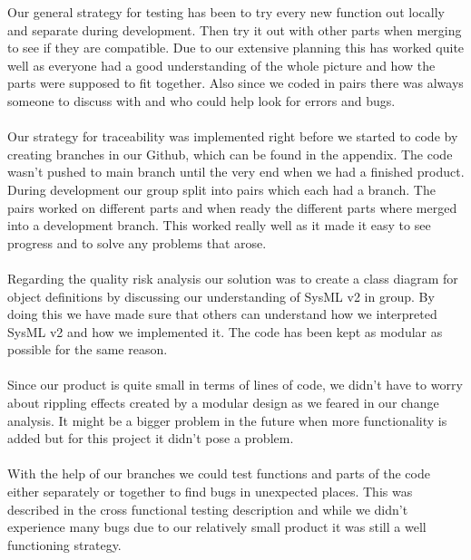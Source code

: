 \documentclass{article}
\begin{document}
Our general strategy for testing has been to try every new function out locally and separate during development. Then try it out with other parts when merging to see if they are compatible. Due to our extensive planning this has worked quite well as everyone had a good understanding of the whole picture and how the parts were supposed to fit together. Also since we coded in pairs there was always someone to discuss with and who could help look for errors and bugs.
\\\\
Our strategy for traceability was implemented right before we started to code by creating branches in our Github, which can be found in the appendix. The code wasn't pushed to main branch until the very end when we had a finished product. During development our group split into pairs which each had a branch. The pairs worked on different parts and when ready the different parts where merged into a development branch. This worked really well as it made it easy to see progress and to solve any problems that arose. 
\\\\
Regarding the quality risk analysis our solution was to create a class diagram for object definitions by discussing our understanding of SysML v2 in group. By doing this we have made sure that others can understand how we interpreted SysML v2 and how we implemented it. The code has been kept as modular as possible for the same reason. 
\\\\
Since our product is quite small in terms of lines of code, we didn't have to worry about rippling effects created by a modular design as we feared in our change analysis. It might be a bigger problem in the future when more functionality is added but for this project it didn't pose a problem. 
\\\\
With the help of our branches we could test functions and parts of the code either separately or together to find bugs in unexpected places. This was described in the cross functional testing description and while we didn't experience many bugs due to our relatively small product it was still a well functioning strategy.

\newpage
\end{document}
